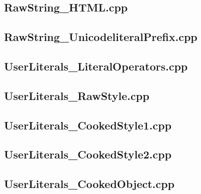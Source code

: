 \documentclass[11pt]{report}
\begin{document}
\begin{appendix}
\subsection{RawString\_HTML.cpp}
\label{RawString_HTML}


\subsection{RawString\_UnicodeliteralPrefix.cpp}
\label{RawString_UnicodeliteralPrefix}


\subsection{UserLiterals\_LiteralOperators.cpp}
\label{UserLiterals_LiteralOperators}


\subsection{UserLiterals\_RawStyle.cpp}
\label{UserLiterals_RawStyle}


\subsection{UserLiterals\_CookedStyle1.cpp}
\label{UserLiterals_CookedStyle1}


\subsection{UserLiterals\_CookedStyle2.cpp}
\label{UserLiterals_CookedStyle2}


\subsection{UserLiterals\_CookedObject.cpp}
\label{UserLiterals_CookedObject}



\end{appendix}
\end{document}
